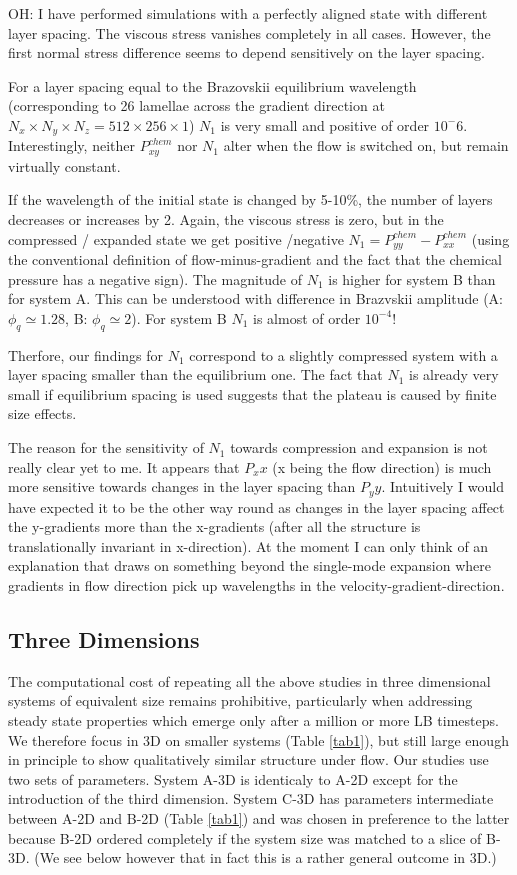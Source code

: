 \documentclass[8.5pt,twoside,twocolumn]{article}
\begin{document}
OH: I have performed simulations with a perfectly aligned state with different layer spacing. The viscous stress vanishes completely in all cases.
However, the first normal stress difference seems to depend sensitively on the layer spacing.

For a layer spacing equal to the Brazovskii equilibrium wavelength  (corresponding to 26 lamellae across the gradient direction at $N_x \times N_y \times N_z = 512 \times 256 \times 1$) $N_1$ is very small and positive of order $10^-6$.
Interestingly, neither $P^{chem}_{xy}$ nor $N_1$ alter when the flow is switched on, but remain virtually constant.

If the wavelength of the initial state is changed by 5-10\%, the number of layers decreases or increases by 2.
Again, the viscous stress is zero, but in the compressed / expanded state we get positive /negative $N_1=P^{chem}_{yy}-P^{chem}_{xx}$ (using the conventional definition of flow-minus-gradient and the fact that the chemical pressure has a negative sign). 
The magnitude of $N_1$ is higher for system B than for system A. This can be understood with difference in Brazvskii amplitude (A: $\phi_q\simeq1.28$, B: $\phi_q\simeq 2$).
For system B $N_1$ is almost of order $10^{-4}$! 

Therfore, our findings for $N_1$ correspond to a slightly compressed system with a layer spacing smaller than the equilibrium one. The fact that $N_1$ is already very small if equilibrium spacing is used suggests that the plateau is caused by finite size effects.

The reason for the sensitivity of $N_1$ towards compression and expansion is not really clear yet to me. 
It appears that $P_xx$ (x being the flow direction) is much more sensitive towards changes in the layer spacing than $P_yy$. Intuitively I would have expected it to be the other way round as changes in the layer spacing affect the y-gradients more than the x-gradients (after all the structure is translationally invariant in x-direction).
At the moment I can only think of an explanation that draws on something beyond the single-mode expansion where gradients in flow direction pick up wavelengths in the velocity-gradient-direction.  

\subsection{Three Dimensions}
\label{results3D}

The computational cost of repeating all the above studies in three dimensional systems of equivalent size remains prohibitive, particularly when addressing steady state properties which emerge only after a million or more LB timesteps. We therefore focus in 3D on smaller systems (Table \ref{tab1}), but still large enough in principle to show qualitatively similar structure under flow. Our studies use two sets of parameters. System A-3D is identicaly to A-2D except for the introduction of the third dimension. System C-3D has parameters intermediate between A-2D and B-2D (Table \ref{tab1}) and was chosen in preference to the latter because B-2D ordered completely if the system size was matched to a slice of B-3D. (We see below however that in fact this is a rather general outcome in 3D.)
\end{document}
